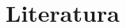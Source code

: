 \chapter{Literatura}
%
\renewcommand{\bibsection}{}
\begin{thebibliography}{biblio.bib}
\end{thebibliography}
